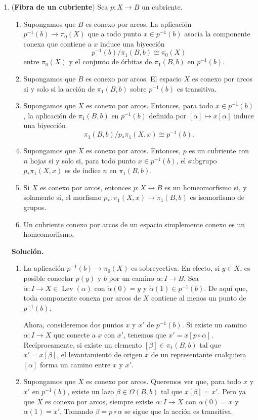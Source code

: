 \documentclass[11pt,a4paper]{article}
\theoremstyle{plain}
\theoremstyle{definition}
\theoremstyle{remark}
\DeclareMathOperator{\Lev}{Lev}
\begin{document}
\begin{enumerate}[label=\arabic*.,leftmargin=*]
\item (\textbf{Fibra de un cubriente}) Sea $p:X\to B$ un cubriente.
\begin{enumerate}[label=\alph*)]
\item Supongamos que $B$ es conexo por arcos. La aplicación
$p^{-1}(b)\to\pi_0(X)$ que a todo punto $x\in p^{-1}(b)$ asocia la
componente conexa que contiene a $x$ induce una biyección
\[
p^{-1}(b)/\pi_1(B,b)\cong\pi_0(X)
\]
entre $\pi_0(X)$ y el conjunto de órbitas de $\pi_1(B,b)$ en $p^{-1}(b)$.
\item Supongamos que $B$ es conexo por arcos. El espacio $X$ es conexo por
arcos si y solo si la acción de $\pi_1(B,b)$ sobre $p^{-1}(b)$ es
transitiva.
\item Supongamos que $X$ es conexo por arcos. Entonces, para todo
$x\in p^{-1}(b)$, la aplicación de $\pi_1(B,b)$ en $p^{-1}(b)$ definida por
$[\alpha]\mapsto x[\alpha]$ induce una biyección
\[
\pi_1(B,b)/p_*\pi_1(X,x)\cong p^{-1}(b).
\]
\item Supongamos que $X$ es conexo por arcos. Entonces, $p$ es un cubriente
con $n$ hojas si y solo si, para todo punto $x\in p^{-1}(b)$, el subgrupo
$p_*\pi_1(X,x)$ es de índice $n$ en $\pi_1(B,b)$.
\item Si $X$ es conexo por arcos, entonces $p:X\to B$ es un homeomorfismo
si, y solamente si, el morfismo $p_*:\pi_1(X,x)\to\pi_1(B,b)$ es
isomorfismo de grupos.
\item Un cubriente conexo por arcos de un espacio simplemente conexo es un
homeomorfismo.
\end{enumerate}

\noindent\textbf{Solución.}
\begin{enumerate}[label=\alph*)]
\item La aplicación $p^{-1}(b)\to\pi_0(X)$ es sobreyectiva. En efecto, si
$y\in X$, es posible conectar $p(y)$ y $b$ por un camino $\alpha:I\to B$.
Sea $\tilde\alpha:I\to X\in\Lev(\alpha)$ con $\tilde\alpha(0)=y$ y
$\tilde\alpha(1)\in p^{-1}(b)$. De aquí que, toda componente conexa por
arcos de $X$ contiene al menos un punto de $p^{-1}(b)$.

Ahora, consideremos dos puntos $x$ y $x'$ de $p^{-1}(b)$. Si existe un
camino $\alpha:I\to X$ que conecte a $x$ con $x'$, tenemos que
$x'=x[p\circ\alpha]$. Recíprocamente, si existe un elemento
$[\beta]\in\pi_1(B,b)$ tal que $x'=x[\beta]$, el levantamiento de origen $x$
de un representante cualquiera $[\alpha]$ forma un camino entre $x$ y $x'$.
\item Supongamos que $X$ es conexo por arcos. Queremos ver que, para todo
$x$ y $x'$ en $p^{-1}(b)$, existe un lazo $\beta\in\Omega(B,b)$ tal que
$x[\beta]=x'$. Pero ya que $X$ es conexo por arcos, siempre existe
$\alpha:I\to X$ con $\alpha(0)=x$ y $\alpha(1)=x'$. Tomando $\beta=p\circ\alpha$
se sigue que la acción es transitiva.


\end{enumerate}
\end{enumerate}
\end{document}
